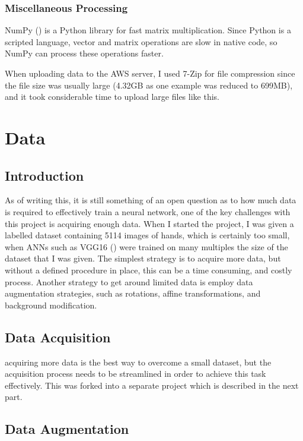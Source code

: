         \subsubsection{Miscellaneous Processing}
        NumPy (\cite{5725236}) is a Python library for fast matrix multiplication. Since Python is a scripted language, vector and matrix operations are slow in native code, so NumPy can process these operations faster.

        When uploading data to the AWS server, I used 7-Zip for file compression since the file size was usually large (4.32GB as one example was reduced to 699MB), and it took considerable time to upload large files like this.


\section{Data}
    \subsection{Introduction}
    As of writing this, it is still something of an open question as to how much data is required to effectively train a neural network, one of the key challenges with this project is acquiring enough data. When I started the project, I was given a labelled dataset containing 5114 images of hands, which is certainly too small, when ANNs such as VGG16 (\cite{vggnet}) were trained on many multiples the size of the dataset that I was given. The simplest strategy is to acquire more data, but without a defined procedure in place, this can be a time consuming, and costly process. Another strategy to get around limited data is employ data augmentation strategies, such as rotations, affine transformations, and background modification.

    \subsection{Data Acquisition}
    acquiring more data is the best way to overcome a small dataset, but the acquisition process needs to be streamlined in order to achieve this task effectively. This was forked into a separate project which is described in the next part.

    \subsection{Data Augmentation}
